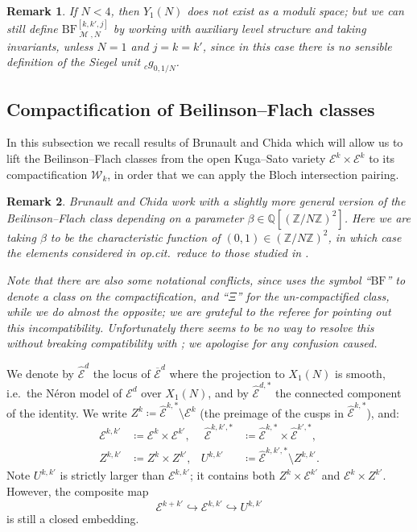 \documentclass[10pt,a4paper]{amsart}
\newcommand{\BF}{\mathrm{BF}}
\newcommand{\Ell}{\mathcal{E}}
\newcommand{\KS}{\mathscr{W}}
\newcommand{\Q}{\numberset{Q}}
\newcommand{\Z}{\numberset{Z}}
\DeclareMathOperator{\mot}{\mathscr{M}}
\newcommand{\numberset}{\mathbb}
\newtheorem{remark}{Remark}
\begin{document}
  \begin{remark}
   If $N < 4$, then $Y_1(N)$ does not exist as a moduli space; but we can still define $\BF^{[k,k',j]}_{\mot, N}$ by working with auxiliary level structure and taking invariants, \emph{unless} $N = 1$ and $j = k = k'$, since in this case there is no sensible definition of the Siegel unit ${}_c g_{0, 1/N}$.
  \end{remark}

 \subsection{Compactification of Beilinson--Flach classes}
 \label{subsec:compactification-bf}

  In this subsection we recall results of Brunault and Chida \cite[\S 7-8]{brunaultchida16} which will allow us to lift the Beilinson--Flach classes from the open Kuga--Sato variety $\Ell^k \times \Ell^k$ to its compactification $\KS_k$, in order that we can apply the Bloch intersection pairing.
  
  \begin{remark}
   Brunault and Chida work with a slightly more general version of the Beilinson--Flach class depending on a parameter $\beta \in \Q[(\Z / N\Z)^2]$. Here we are taking $\beta$ to be the characteristic function of $(0, 1) \in (\Z / N\Z)^2$, in which case the elements considered in \emph{op.cit.}~reduce to those studied in \cite{KLZ20}.
   
   Note that there are also some notational conflicts, since \cite{brunaultchida16} uses the symbol ``$\BF$'' to denote a class on the compactification, and ``$\Xi$'' for the un-compactified class, while we do almost the opposite; we are grateful to the referee for pointing out this incompatibility. Unfortunately there seems to be no way to resolve this without breaking compatibility with \cite{KLZ20}; we apologise for any confusion caused.\end{remark}

  We denote by $\hat{\Ell}^d$ the locus of $\overline{\Ell}^d$ where the projection to $X_1(N)$ is smooth, i.e.\ the Néron model of $\Ell^d$ over $X_1(N)$, and by $\hat{\Ell}^{d,*}$ the connected component of the identity. We write $Z^k \coloneqq \hat{\Ell}^{k,*} \setminus \Ell^k$ (the preimage of the cusps in $\hat{\Ell}^{k,*}$), and:
  \begin{align*}
   \Ell^{k,k'} &\coloneqq \Ell^k \times \Ell^{k'}, &\; \hat{\Ell}^{k,k',*} &\coloneqq \hat{\Ell}^{k,*}\times \hat{\Ell}^{k',*}, \\
   Z^{k,k'} &\coloneqq Z^k\times Z^{k'}, & U^{k,k'} &\coloneqq \hat{\Ell}^{k,k',*} \setminus Z^{k,k'}.
  \end{align*}
  Note $U^{k,k'}$ is strictly larger than $\Ell^{k, k'}$; it contains both $Z^k \times \Ell^{k'}$ and $\Ell^k \times Z^{k'}$. However, the composite map
  \[
      \Ell^{k+k'} \hookrightarrow \Ell^{k, k'} \hookrightarrow U^{k,k'}
  \]
  is still a closed embedding.
  
\end{document}

